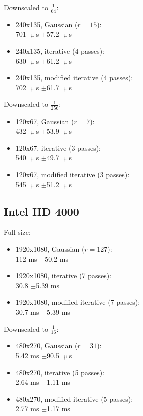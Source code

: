 \documentclass[english,fleqn,10pt,twocolumn]{article}
\begin{document}
Downscaled to $\frac 1{64}$:
\begin{itemize}
    \item 240x135, Gaussian ($r = 15$): \\
        701 $\upmu$s $\pm$57.2 $\upmu$s
    \item 240x135, iterative (4 passes): \\
        630 $\upmu$s $\pm$61.2 $\upmu$s
    \item 240x135, modified iterative (4 passes): \\
        702 $\upmu$s $\pm$61.7 $\upmu$s
\end{itemize}

Downscaled to $\frac 1{256}$:
\begin{itemize}
    \item 120x67, Gaussian ($r = 7$): \\
        432 $\upmu$s $\pm$53.9 $\upmu$s
    \item 120x67, iterative (3 passes): \\
        540 $\upmu$s $\pm$49.7 $\upmu$s
    \item 120x67, modified iterative (3 passes): \\
        545 $\upmu$s $\pm$51.2 $\upmu$s
\end{itemize}

\newpage

\subsection{Intel HD 4000}

Full-size:
\begin{itemize}
    \item 1920x1080, Gaussian ($r = 127$): \\
        112 ms $\pm$50.2 ms
    \item 1920x1080, iterative (7 passes): \\
        30.8 $\pm$5.39 ms
    \item 1920x1080, modified iterative (7 passes): \\
        30.7 ms $\pm$5.39 ms
\end{itemize}

Downscaled to $\frac 1{16}$:
\begin{itemize}
    \item 480x270, Gaussian ($r = 31$): \\
        5.42 ms $\pm$90.5 $\upmu$s
    \item 480x270, iterative (5 passes): \\
        2.64 ms $\pm$1.11 ms
    \item 480x270, modified iterative (5 passes): \\
        2.77 ms $\pm$1.17 ms
\end{itemize}
\end{document}
